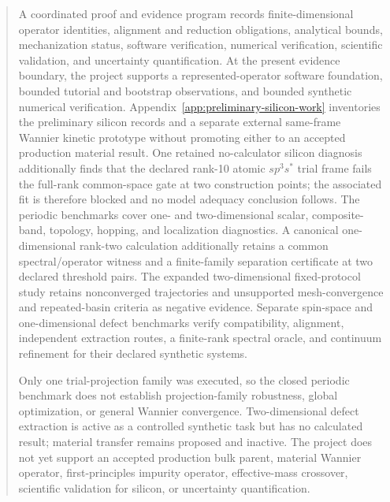 \documentclass[12pt,oneside]{report}
\theoremstyle{monographplain}
\theoremstyle{monographdefinition}
\begin{document}
\begin{abstract}
A coordinated proof and evidence program records finite-dimensional operator
identities, alignment and reduction obligations, analytical bounds,
mechanization status, software verification, numerical verification, scientific
validation, and uncertainty quantification. At the present evidence boundary,
the project supports a represented-operator software foundation, bounded
tutorial and bootstrap observations, and bounded synthetic numerical
verification. Appendix~\ref{app:preliminary-silicon-work} inventories the
preliminary silicon records and a separate external same-frame Wannier kinetic
prototype without promoting either to an accepted production material result.
One retained no-calculator silicon diagnosis additionally finds that the declared
rank-10 atomic $sp^3s^{\ast}$ trial frame fails the full-rank common-space gate at
two construction points; the associated fit is therefore blocked and no model
adequacy conclusion follows. The periodic benchmarks cover one- and
two-dimensional scalar,
composite-band, topology, hopping, and localization diagnostics. A canonical
one-dimensional rank-two calculation additionally retains a common
spectral/operator witness and a finite-family separation certificate at two
declared threshold pairs. The expanded two-dimensional fixed-protocol study retains nonconverged trajectories and
unsupported mesh-convergence and repeated-basin criteria as negative evidence.
Separate spin-space and one-dimensional defect benchmarks verify compatibility,
alignment, independent extraction routes, a finite-rank spectral oracle, and
continuum refinement for their declared synthetic systems.

Only one trial-projection family was executed, so the closed periodic benchmark
does not establish projection-family robustness, global optimization, or
general Wannier convergence. Two-dimensional defect extraction is active as a
controlled synthetic task but has no calculated result; material transfer
remains proposed and inactive. The project does not yet support an accepted
production bulk parent, material Wannier operator, first-principles impurity
operator, effective-mass crossover, scientific validation for silicon, or
uncertainty quantification.
\end{abstract}

\clearpage
\hypersetup{pageanchor=true}
\pagestyle{monograph}

\tableofcontents
\clearpage
{}
\end{document}
